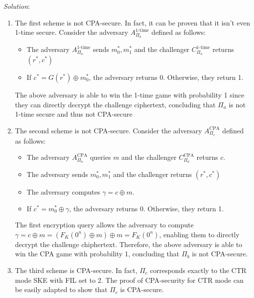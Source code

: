 \documentclass[a4paper, 12pt]{report}
\begin{document}
    \textit{Solution}:

    \begin{enumerate}[label=\Alph*]
        \item The first scheme is not CPA-secure. In fact, it can be proven that it isn't even 1-time secure. Consider the adversary $A_{\Pi_a}^{\text{1-time}}$ defined as follows:
        \begin{itemize}
            \item The adversary $A_{\Pi_a}^{\text{1-time}}$ sends $m_0^*, m_1^*$ and the challenger $C_{\Pi_a}^{\text{1-time}}$ returns $(r^*, c^*)$
            \item If $c^* = G(r^*) \oplus m_0^*$, the adversary returns 0. Otherwise, they return 1.
        \end{itemize}

        The above adversary is able to win the 1-time game with probability 1 since they can directly decrypt the challenge ciphertext, concluding that $\Pi_a$ is not 1-time secure and thus not CPA-secure

        \item The second scheme is not CPA-secure. Consider the adversary $A_{\Pi_c}^{\text{CPA}}$ defined as follows:
        \begin{itemize}
            \item The adversary $A_{\Pi_a}^{\text{CPA}}$  queries $m$ and the challenger $C_{\Pi_a}^{\text{CPA}}$ returns $c$.
            \item The adversary sends $m_0^*, m_1^*$ and the challenger returns $(r^*, c^*)$
            \item The adversary computes $\gamma = c \oplus m$.
            \item If $c^* = m_0^* \oplus \gamma$, the adversary returns 0. Otherwise, they return 1.
        \end{itemize}

        The first encryption query allows the adversary to compute $\gamma = c \oplus m = (F_K(0^n) \oplus m) \oplus m = F_K(0^n)$, enabling them to directly decrypt the challenge chiphertext. Therefore, the above adversary is able to win the CPA game with probability 1, concluding that $\Pi_b$ is not CPA-secure.

        \item The third scheme is CPA-secure. In fact, $\Pi_c$ corresponds exactly to the CTR mode SKE with FIL set to 2. The proof of CPA-security for CTR mode can be easily adapted to show that $\Pi_c$ is CPA-secure.
    \end{enumerate}
\end{document}
